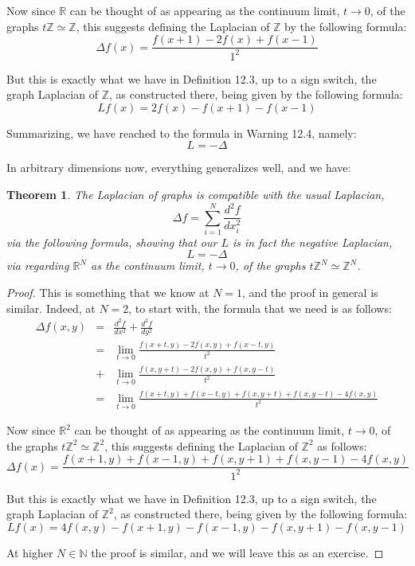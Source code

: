 \documentclass[12pt]{amsbook}
\newtheorem{theorem}{Theorem}[chapter]
\begin{document}
Now since $\mathbb R$ can be thought of as appearing as the continuum limit, $t\to0$, of the graphs $t\mathbb Z\simeq\mathbb Z$, this suggests defining the Laplacian of $\mathbb Z$ by the following formula:
$$\Delta f(x)=\frac{f(x+1)-2f(x)+f(x-1)}{1^2}$$

But this is exactly what we have in Definition 12.3, up to a sign switch, the graph Laplacian of $\mathbb Z$, as constructed there, being given by the following formula:
$$Lf(x)=2f(x)-f(x+1)-f(x-1)$$

Summarizing, we have reached to the formula in Warning 12.4, namely:
$$L=-\Delta$$

In arbitrary dimensions now, everything generalizes well, and we have:


\begin{theorem}
The Laplacian of graphs is compatible with the usual Laplacian,
$$\Delta f=\sum_{i=1}^N\frac{d^2f}{dx_i^2}$$
via the following formula, showing that our $L$ is in fact the negative Laplacian,
$$L=-\Delta$$
via regarding $\mathbb R^N$ as the continuum limit, $t\to0$, of the graphs $t\mathbb Z^N\simeq\mathbb Z^N$.
\end{theorem}

\begin{proof}
This is something that we know at $N=1$, and the proof in general is similar. Indeed, at $N=2$, to start with, the formula that we need is as follows:
\begin{eqnarray*}
\Delta f(x,y)
&=&\frac{d^2f}{dx^2}+\frac{d^2f}{dy^2}\\
&=&\lim_{t\to 0}\frac{f(x+t,y)-2f(x,y)+f(x-t,y)}{t^2}\\
&+&\lim_{t\to 0}\frac{f(x,y+t)-2f(x,y)+f(x,y-t)}{t^2}\\
&=&\lim_{t\to 0}\frac{f(x+t,y)+f(x-t,y)+f(x,y+t)+f(x,y-t)-4f(x,y)}{t^2}
\end{eqnarray*}

Now since $\mathbb R^2$ can be thought of as appearing as the continuum limit, $t\to0$, of the graphs $t\mathbb Z^2\simeq\mathbb Z^2$, this suggests defining the Laplacian of $\mathbb Z^2$ as follows:
$$\Delta f(x)
=\frac{f(x+1,y)+f(x-1,y)+f(x,y+1)+f(x,y-1)-4f(x,y)}{1^2}$$

But this is exactly what we have in Definition 12.3, up to a sign switch, the graph Laplacian of $\mathbb Z^2$, as constructed there, being given by the following formula:
$$Lf(x)=4f(x,y)-f(x+1,y)-f(x-1,y)-f(x,y+1)-f(x,y-1)$$

At higher $N\in\mathbb N$ the proof is similar, and we will leave this as an exercise.
\end{proof}
\end{document}
